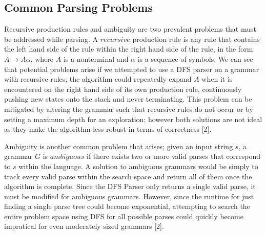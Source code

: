 \documentclass[a4paper, 11pt]{article}
\begin{document}
\begin{center}
\end{center}

\subsection{Common Parsing Problems}
Recursive production rules and ambiguity are two prevalent problems that must be addressed while parsing. A $recursive$ production rule is any rule that contains the left
hand side of the rule within the right hand side of the rule, in the form $A \to A \alpha$, where $A$ is a nonterminal and $\alpha$ is a sequence of symbols. We can see that
potential problems arise if we attempted to use a DFS parser on a grammar with recursive rules; the algorithm could repeatedly expand $A$ when it is encountered on the right
hand side of its own production rule, continuously pushing new states onto the stack and never terminating. This problem can be mitigated by altering the grammar such that
recursive rules do not occur or by setting a maximum depth for an exploration; however both solutions are not ideal as they make the algorithm less robust in terms of 
correctness [2].

Ambiguity is another common problem that arises; given an input string $s$, a grammar $G$ is $ambiguous$ if there exists two or more valid parses that correspond to $s$ within
the language. A solution to ambiguous grammars would be simply to track every valid parse within the search space and return all of them once the algorithm is complete. Since
the DFS Parser only returns a single valid parse, it must be modified for ambiguous grammars. However, since the runtime for just finding a single parse tree could become
exponential, attempting to search the entire problem space using DFS for all possible parses could quickly become impratical for even moderately sized grammars [2].
\end{document}
